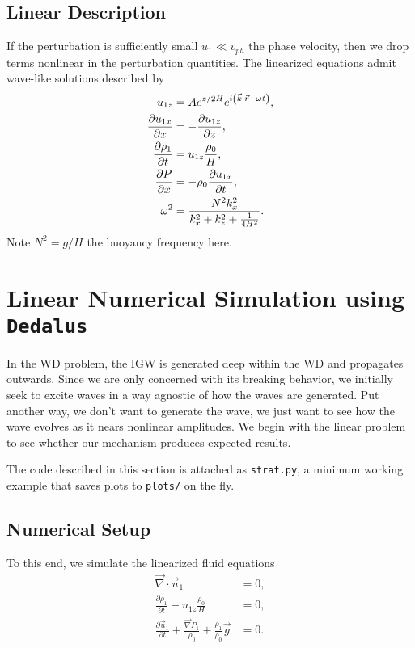 \documentclass[11pt,
        usenames, %
        dvipsnames %
    ]{article}
\newcommand*{\pd}[2]{\frac{\partial#1}{\partial#2}}
\DeclarePairedDelimiter\p{\lparen}{\rparen}
\begin{document}
\subsection{Linear Description}

If the perturbation is sufficiently small $u_1 \ll v_{ph}$ the phase velocity,
then we drop terms nonlinear in the perturbation quantities. The linearized
equations admit wave-like solutions described by
\begin{subequations}\label{eq:lin_sol}
    \begin{align}
        u_{1z} &= Ae^{z/2H}e^{i\p*{\vec{k} \cdot \vec{r} - \omega t}},\\
        \pd{u_{1x}}{x} &= -\pd{u_{1z}}{z},\\
        \pd{\rho_1}{t} &= u_{1z}\frac{\rho_0}{H},\\
        \pd{P}{x} &= -\rho_0 \pd{u_{1x}}{t},\\
        \omega^2 &= \frac{N^2k_x^2}{k_x^2 + k_z^2 + \frac{1}{4H^2}}.
    \end{align}
\end{subequations}
Note $N^2 = g/H$ the buoyancy frequency here.

\section{Linear Numerical Simulation using \texttt{Dedalus}}

In the WD problem, the IGW is generated deep within the WD and propagates
outwards. Since we are only concerned with its breaking behavior, we initially
seek to excite waves in a way agnostic of how the waves are generated. Put
another way, we don't want to generate the wave, we just want to see how the
wave evolves as it nears nonlinear amplitudes. We begin with the linear problem
to see whether our mechanism produces expected results.

The code described in this section is attached as \texttt{strat.py}, a minimum
working example that saves plots to \texttt{plots/} on the fly.

\subsection{Numerical Setup}

To this end, we simulate the linearized fluid equations
\begin{subequations}\label{eq:lin_feq}
    \begin{align}
        \vec{\nabla} \cdot \vec{u}_1 &= 0,\\
        \pd{\rho_1}{t} - u_{1z}\frac{\rho_0}{H} &= 0,\\
        \pd{\vec{u}_1}{t} + \frac{\vec{\nabla}P_1}{\rho_0}
            + \frac{\rho_1}{\rho_0}\vec{g} &= 0.
    \end{align}
\end{subequations}
\end{document}
